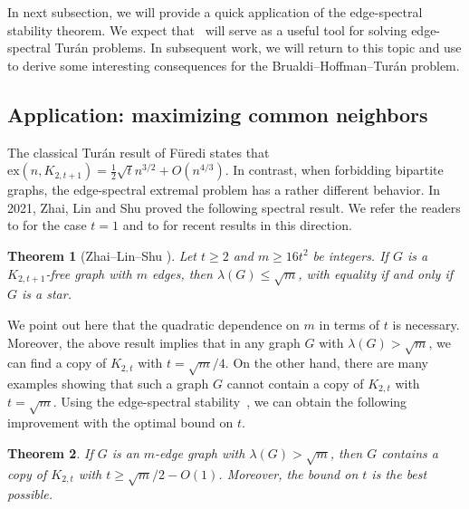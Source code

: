 \documentclass[11pt,a4paper]{article}
\newtheorem{theorem}{Theorem}[section]
\theoremstyle{definition}
\theoremstyle{remark}
\begin{document}
In next subsection, we will provide a quick application of the edge-spectral stability theorem. 
We expect that~ will serve as a useful tool for solving edge-spectral Tur\'an problems. In subsequent work, we will return to this topic and use  to derive some interesting consequences for the Brualdi--Hoffman--Tur\'{a}n problem.


\subsection{Application: maximizing common neighbors} 

 

The classical Tur\'{a}n result of F\"{u}redi \cite{Fur1996jcta} states that $\mathrm{ex}(n,K_{2,t+1})=\frac{1}{2}\sqrt{t}n^{3/2} +O(n^{4/3})$. 
In contrast, when forbidding bipartite graphs, the edge-spectral extremal problem has a rather different behavior. 
In 2021, Zhai, Lin and Shu \cite{ZLS2021} proved the following spectral result.  We refer the readers to \cite{Niki2009} for the case $t=1$ and to \cite{ZS2022dm,NZ2021b,LLZ2024-book-qua} for recent results in this direction.

\begin{theorem}[Zhai--Lin--Shu \cite{ZLS2021}]
\label{thm-ZLS-common}
Let $t\ge 2$ and $m\ge 16t^2$ be integers. 
If $G$ is a $K_{2,t+1}$-free graph with $m$ edges, then $\lambda (G)\le \sqrt{m}$, with equality if and only if $G$ is a star.  
\end{theorem}

We point out here that the quadratic dependence on $m$ in terms of $t$ is necessary. Moreover, the above result implies that in any graph $G$ with $\lambda (G)> \sqrt{m}$, we can find a copy of $K_{2,t}$ with $t=\sqrt{m}/4$. On the other hand, there are many examples showing that such a graph $G$ cannot contain a copy of $K_{2,t}$ with $t=\sqrt{m}$. 
Using the edge-spectral stability~, we can obtain the following improvement with the optimal bound on $t$.

\begin{theorem} \label{thm-common}
    If $G$ is an $m$-edge graph with 
    $\lambda(G) > \sqrt{m}$, then $G$ contains a copy of $K_{2, t}$ with $t \ge \sqrt{m} / 2 - O(1)$. Moreover, the bound on $t$ is the best possible. 
\end{theorem}
\end{document}
